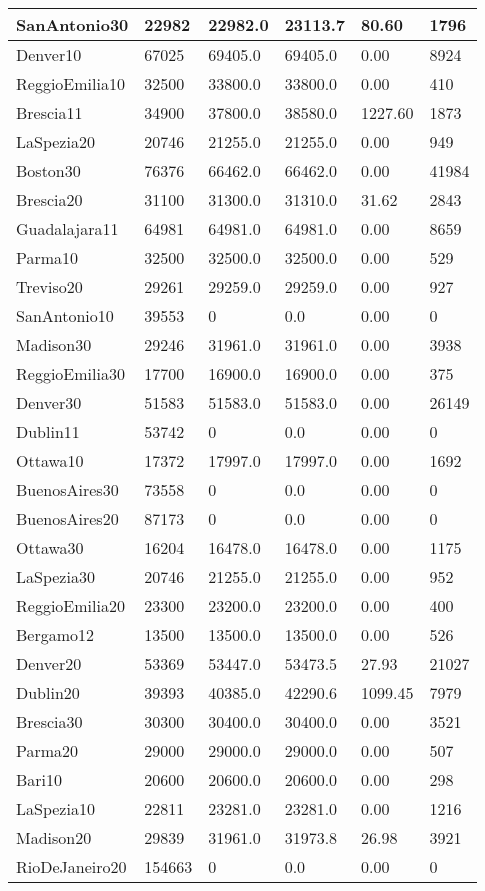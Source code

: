 \begin{longtable}[c]{|l|l|l|l|l|l|}
SanAntonio30 & 22982 & 22982.0 & 23113.7 & 80.60 & 1796 \\ \hline
Denver10 & 67025 & 69405.0 & 69405.0 & 0.00 & 8924 \\ \hline
ReggioEmilia10 & 32500 & 33800.0 & 33800.0 & 0.00 & 410 \\ \hline
Brescia11 & 34900 & 37800.0 & 38580.0 & 1227.60 & 1873 \\ \hline
LaSpezia20 & 20746 & 21255.0 & 21255.0 & 0.00 & 949 \\ \hline
Boston30 & 76376 & 66462.0 & 66462.0 & 0.00 & 41984 \\ \hline
Brescia20 & 31100 & 31300.0 & 31310.0 & 31.62 & 2843 \\ \hline
Guadalajara11 & 64981 & 64981.0 & 64981.0 & 0.00 & 8659 \\ \hline
Parma10 & 32500 & 32500.0 & 32500.0 & 0.00 & 529 \\ \hline
Treviso20 & 29261 & 29259.0 & 29259.0 & 0.00 & 927 \\ \hline
SanAntonio10 & 39553 & 0 & 0.0 & 0.00 & 0 \\ \hline
Madison30 & 29246 & 31961.0 & 31961.0 & 0.00 & 3938 \\ \hline
ReggioEmilia30 & 17700 & 16900.0 & 16900.0 & 0.00 & 375 \\ \hline
Denver30 & 51583 & 51583.0 & 51583.0 & 0.00 & 26149 \\ \hline
Dublin11 & 53742 & 0 & 0.0 & 0.00 & 0 \\ \hline
Ottawa10 & 17372 & 17997.0 & 17997.0 & 0.00 & 1692 \\ \hline
BuenosAires30 & 73558 & 0 & 0.0 & 0.00 & 0 \\ \hline
BuenosAires20 & 87173 & 0 & 0.0 & 0.00 & 0 \\ \hline
Ottawa30 & 16204 & 16478.0 & 16478.0 & 0.00 & 1175 \\ \hline
LaSpezia30 & 20746 & 21255.0 & 21255.0 & 0.00 & 952 \\ \hline
ReggioEmilia20 & 23300 & 23200.0 & 23200.0 & 0.00 & 400 \\ \hline
Bergamo12 & 13500 & 13500.0 & 13500.0 & 0.00 & 526 \\ \hline
Denver20 & 53369 & 53447.0 & 53473.5 & 27.93 & 21027 \\ \hline
Dublin20 & 39393 & 40385.0 & 42290.6 & 1099.45 & 7979 \\ \hline
Brescia30 & 30300 & 30400.0 & 30400.0 & 0.00 & 3521 \\ \hline
Parma20 & 29000 & 29000.0 & 29000.0 & 0.00 & 507 \\ \hline
Bari10 & 20600 & 20600.0 & 20600.0 & 0.00 & 298 \\ \hline
LaSpezia10 & 22811 & 23281.0 & 23281.0 & 0.00 & 1216 \\ \hline
Madison20 & 29839 & 31961.0 & 31973.8 & 26.98 & 3921 \\ \hline
RioDeJaneiro20 & 154663 & 0 & 0.0 & 0.00 & 0 \\ \hline
\end{longtable}